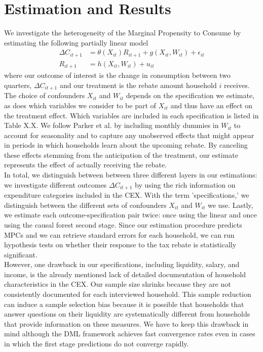 \section{Estimation and Results} \label{sec:estim_res}
We investigate the heterogeneity of the Marginal Propensity to Consume by estimating the following partially linear model
\begin{align}
    \Delta C_{it+1}&=\theta(X_{it})R_{it+1}+g(X_{it}, W_{it})+\epsilon_{it} \label{eq:plm_C1}\\
    R_{it+1}&=h(X_{it}, W_{it})+u_{it} \label{eq:plm_C2}
\end{align}
where our outcome of interest is the change in consumption between two quarters, $\Delta C_{it+1}$ and our treatment is the rebate amount household $i$ receives. The choice of confounders $X_{it}$ and $W_{it}$ depends on the specification we estimate, as does which variables we consider to be part of $X_{it}$ and thus have an effect on the treatment effect. Which variables are included in each specification is listed in Table X.X. We follow Parker et al. by including monthly dummies in $W_{it}$ to account for seasonality and to capture any unobserved effects that might appear in periods in which households learn about the upcoming rebate. By canceling these effects stemming from the anticipation of the treatment, our estimate represents the effect of actually receiving the rebate. \\ 
In total, we distinguish between between three different layers in our estimations: we investigate different outcomes $\Delta C_{it+1}$ by using the rich information on expenditure categories included in the CEX. With the term 'specifications,' we distinguish between the different sets of confounders $X_{it}$ and $W_{it}$ we use. Lastly, we estimate each outcome-specification pair twice: once using the linear and once using the causal forest second stage. Since our estimation procedure predicts MPCs and we can retrieve standard errors for each household, we can run hypothesis tests on whether their response to the tax rebate is statistically significant. \\
However, one drawback in our specifications, including liquidity, salary, and income, is the already mentioned lack of detailed documentation of household characteristics in the CEX. Our sample size shrinks because they are not consistently documented for each interviewed household. This sample reduction can induce a sample selection bias because it is possible that households that answer questions on their liquidity are systematically different from households that provide information on these measures. We have to keep this drawback in mind although the DML framework achieves fast convergence rates even in cases in which the first stage predictions do not converge rapidly.

